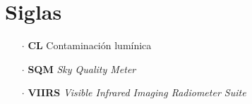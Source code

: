 \chapter{Siglas}

\begin{itemize}

\item[$\cdot$] \textbf{CL} Contaminación lumínica
		
\item[$\cdot$] \textbf{SQM} \textit{Sky Quality Meter}
		
\item[$\cdot$] \textbf{VIIRS} \textit{Visible Infrared Imaging Radiometer Suite} 
		
\end{itemize}